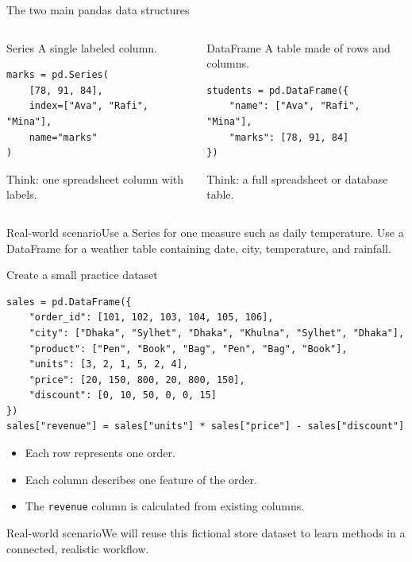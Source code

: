 \documentclass[aspectratio=169,10pt]{beamer}
\newcommand{\scenario}[1]{\begin{block}{Real-world scenario}#1\end{block}}
\begin{document}
\begin{frame}[fragile]{The two main pandas data structures}
\begin{columns}[T,onlytextwidth]
\begin{block}{Series}
A single labeled column.
\begin{lstlisting}
marks = pd.Series(
    [78, 91, 84],
    index=["Ava", "Rafi", "Mina"],
    name="marks"
)
\end{lstlisting}
Think: one spreadsheet column with labels.
\end{block}
\begin{block}{DataFrame}
A table made of rows and columns.
\begin{lstlisting}
students = pd.DataFrame({
    "name": ["Ava", "Rafi", "Mina"],
    "marks": [78, 91, 84]
})
\end{lstlisting}
Think: a full spreadsheet or database table.
\end{block}
\end{columns}
\scenario{Use a Series for one measure such as daily temperature. Use a DataFrame for a weather table containing date, city, temperature, and rainfall.}
\end{frame}

\begin{frame}[fragile]{Create a small practice dataset}
\begin{lstlisting}
sales = pd.DataFrame({
    "order_id": [101, 102, 103, 104, 105, 106],
    "city": ["Dhaka", "Sylhet", "Dhaka", "Khulna", "Sylhet", "Dhaka"],
    "product": ["Pen", "Book", "Bag", "Pen", "Bag", "Book"],
    "units": [3, 2, 1, 5, 2, 4],
    "price": [20, 150, 800, 20, 800, 150],
    "discount": [0, 10, 50, 0, 0, 15]
})
sales["revenue"] = sales["units"] * sales["price"] - sales["discount"]
\end{lstlisting}
\begin{itemize}
\item Each row represents one order.
\item Each column describes one feature of the order.
\item The \texttt{revenue} column is calculated from existing columns.
\end{itemize}
\scenario{We will reuse this fictional store dataset to learn methods in a connected, realistic workflow.}
\end{frame}
\end{document}
